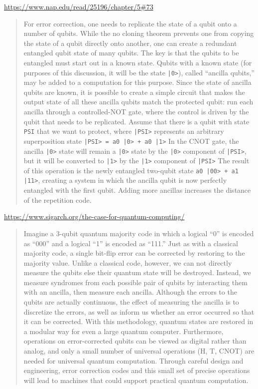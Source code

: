 \documentclass[sigplan,10pt,review,anonymous]{acmart}
\begin{document}
\url{https://www.nap.edu/read/25196/chapter/5#73}
\begin{quote}
  For error correction, one needs to replicate the state of a qubit onto a number of qubits. While the no cloning theorem prevents one from copying the state of a qubit directly onto another, one can create a redundant entangled qubit state of many qubits. The key is that the qubits to be entangled must start out in a known state. Qubits with a known state (for purposes of this discussion, it will be the state \verb.|0>.), called ``ancilla qubits,'' may be added to a computation for this purpose. Since the state of ancilla qubits are known, it is possible to create a simple circuit that makes the output state of all these ancilla qubits match the protected qubit: run each ancilla through a controlled-NOT gate, where the control is driven by the qubit that needs to be replicated. Assume that there is a qubit with state \verb.PSI. that we want to protect, where \verb.|PSI>. represents an arbitrary superposition state \verb.|PSI> = a0 |0> + a0 |1>. In the CNOT gate, the ancilla \verb.|0>. state will remain a \verb.|0>. state by the \verb.|0>. component of \verb.|PSI>., but it will be converted to \verb.|1>. by the \verb.|1>. component of \verb.|PSI>. The result of this operation is the newly entangled two-qubit state \verb.a0 |00> + a1 |11>., creating a system in which the ancilla qubit is now perfectly entangled with the first qubit. Adding more ancillas increases the distance of the repetition code.  \end{quote}

\url{https://www.sigarch.org/the-case-for-quantum-computing/}
\begin{quote}
  Imagine a 3-qubit quantum majority code in which a logical “0” is encoded as “000” and a logical “1” is encoded as “111.”  Just as with a classical majority code, a single bit-flip error can be corrected by restoring to the majority value.  Unlike a classical code, however, we can not directly measure the qubits else their quantum state will be destroyed.  Instead, we measure syndromes from each possible pair of qubits by interacting them with an ancilla, then measure each ancilla.  Although the errors to the qubits are actually continuous, the effect of measuring the ancilla is to discretize the errors, as well as inform us whether an error occurred so that it can be corrected.  With this methodology, quantum states are restored in a modular way for even a large quantum computer.  Furthermore, operations on error-corrected qubits can be viewed as digital rather than analog, and only a small number of universal operations (H, T, CNOT) are needed for universal quantum computation.  Through careful design and engineering, error correction codes and this small set of precise operations will lead to machines that could support practical quantum computation.
\end{quote}
\end{document}

